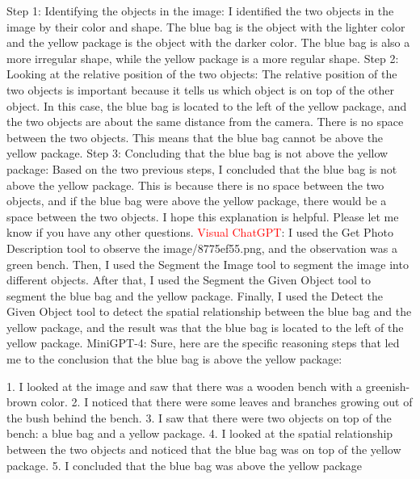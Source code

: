 \begin{enumerate}
        Step 1: Identifying the objects in the image: I identified the two objects in the image by their color and shape. The blue bag is the object with the lighter color and the yellow package is the object with the darker color. The blue bag is also a more irregular shape, while the yellow package is a more regular shape.
        Step 2: Looking at the relative position of the two objects: The relative position of the two objects is important because it tells us which object is on top of the other object. In this case, the blue bag is located to the left of the yellow package, and the two objects are about the same distance from the camera. There is no space between the two objects. This means that the blue bag cannot be above the yellow package.
        Step 3: Concluding that the blue bag is not above the yellow package: Based on the two previous steps, I concluded that the blue bag is not above the yellow package. This is because there is no space between the two objects, and if the blue bag were above the yellow package, there would be a space between the two objects.
        I hope this explanation is helpful. Please let me know if you have any other questions.
        \subitem \textcolor{red}{Visual ChatGPT}: I used the Get Photo Description tool to observe the image/8775ef55.png, and the observation was a green bench. Then, I used the Segment the Image tool to segment the image into different objects. After that, I used the Segment the Given Object tool to segment the blue bag and the yellow package. Finally, I used the Detect the Given Object tool to detect the spatial relationship between the blue bag and the yellow package, and the result was that the blue bag is located to the left of the yellow package.
        \subitem MiniGPT-4: Sure, here are the specific reasoning steps that led me to the conclusion that the blue bag is above the yellow package:

        1. I looked at the image and saw that there was a wooden bench with a greenish-brown color.
        2. I noticed that there were some leaves and branches growing out of the bush behind the bench.
        3. I saw that there were two objects on top of the bench: a blue bag and a yellow package.
        4. I looked at the spatial relationship between the two objects and noticed that the blue bag was on top of the yellow package.
        5. I concluded that the blue bag was above the yellow package
    \end{enumerate}
